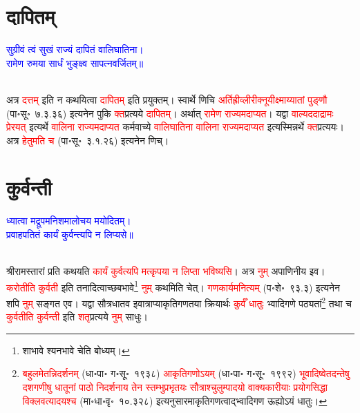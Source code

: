 \section[दापितम्]{दापितम्}
\centering\textcolor{blue}{सुग्रीवं त्वं सुखं राज्यं दापितं वालिघातिना।\nopagebreak\\
रामेण रुमया सार्धं भुङ्क्ष्व सापत्नवर्जितम्॥}\nopagebreak\\
\\
\begin{sloppypar}\justifying\noindent\hspace{10mm} अत्र \textcolor{red}{दत्तम्} इति न कथयित्वा \textcolor{red}{दापितम्} इति प्रयुक्तम्। स्वार्थे णिचि \textcolor{red}{अर्ति\-ह्री\-व्ली\-री\-क्नूयी\-क्ष्माय्यातां पुङ्णौ} (पा॰सू॰~७.३.३६) इत्यनेन पुकि \textcolor{red}{क्त}\-प्रत्यये \textcolor{red}{दापितम्}। अर्थात् \textcolor{red}{रामेण राज्यमदाप्यत}। यद्वा \textcolor{red}{वाल्यददाद्रामः प्रेरयत्} इत्यर्थे \textcolor{red}{वालिना राज्यमदाप्यत} कर्म\-वाच्ये \textcolor{red}{वालि\-घातिना वालिना राज्यमदाप्यत} इत्यस्मिन्नर्थे \textcolor{red}{क्त}\-प्रत्ययः। अत्र \textcolor{red}{हेतुमति च} (पा॰सू॰~३.१.२६) इत्यनेन णिच्।\end{sloppypar}
\section[कुर्वन्ती]{कुर्वन्ती}
\centering\textcolor{blue}{ध्यात्वा मद्रूपमनिशमालोचय मयोदितम्।\nopagebreak\\
प्रवाहपतितं कार्यं कुर्वन्त्यपि न लिप्यसे॥}\nopagebreak\\
\\
\begin{sloppypar}\justifying\noindent\hspace{10mm} श्रीरामस्तारां प्रति कथयति \textcolor{red}{कार्यं कुर्वत्यपि मत्कृपया न लिप्ता भविष्यसि}। अत्र \textcolor{red}{नुम्} अपाणिनीय इव। \textcolor{red}{करोतीति कुर्वती} इति तनादित्वाच्छबभावे\footnote{शाभावे श्यनभावे चेति बोध्यम्।} \textcolor{red}{नुम्} कथमिति चेत्। \textcolor{red}{गण\-कार्यमनित्यम्} (प॰शे॰~९३.३) इत्यनेन शपि \textcolor{red}{नुम्} सङ्गत एव। यद्वा सौत्र\-धातव इवात्राप्याकृति\-गणतया क्रियार्थः \textcolor{red}{कुर्वँ धातुः} भ्वादिगणे पठ्यतां\footnote{\textcolor{red}{बहुलमेतन्निदर्शनम्} (धा॰पा॰ ग॰सू॰~१९३८) \textcolor{red}{आकृतिगणोऽयम्} (धा॰पा॰ ग॰सू॰~१९९२) \textcolor{red}{भूवादिष्वेतदन्तेषु दशगणीषु धातूनां पाठो निदर्शनाय तेन स्तम्भुप्रभृतयः सौत्राश्चुलुम्पादयो वाक्यकारीयाः प्रयोगसिद्धा विक्लवत्यादयश्च} (मा॰धा॰वृ॰~१०.३२८) इत्यनुसारमाकृति\-गणत्वाद्भ्वादि\-गण ऊह्योऽयं धातुः।} तथा च \textcolor{red}{कुर्वतीति कुर्वन्ती} इति \textcolor{red}{शतृ}\-प्रत्यये \textcolor{red}{नुम्} साधुः।\end{sloppypar}
